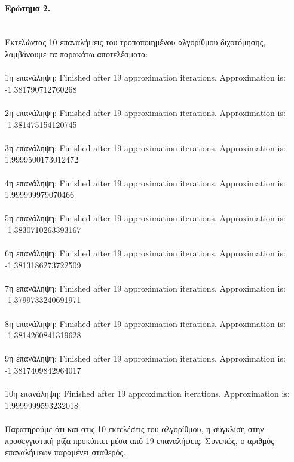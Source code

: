 \documentclass[a4paper,11pt]{article}
\newcommand{\lt}{\latintext}
\begin{document}
\paragraph{Ερώτημα 2.}\mbox{}\\
Εκτελώντας 10 επαναλήψεις του τροποποιημένου αλγορίθμου διχοτόμησης, λαμβάνουμε τα παρακάτω αποτελέσματα:\\
\\1η επανάληψη: {\lt Finished after 19 approximation iterations. Approximation is: -1.381790712760268}\\
\\2η επανάληψη: {\lt Finished after 19 approximation iterations. Approximation is: -1.381475154120745}\\
\\3η επανάληψη: {\lt Finished after 19 approximation iterations. Approximation is: 1.9999500173012472}\\
\\4η επανάληψη: {\lt Finished after 19 approximation iterations. Approximation is: 1.999999979070466}\\
\\5η επανάληψη: {\lt Finished after 19 approximation iterations. Approximation is: -1.3830710263393167}\\
\\6η επανάληψη: {\lt Finished after 19 approximation iterations. Approximation is: -1.3813186273722509}\\
\\7η επανάληψη: {\lt Finished after 19 approximation iterations. Approximation is: -1.3799733240691971}\\
\\8η επανάληψη: {\lt Finished after 19 approximation iterations. Approximation is: -1.3814260841319628}\\
\\9η επανάληψη: {\lt Finished after 19 approximation iterations. Approximation is: -1.3817409842964017}\\
\\10η επανάληψη: {\lt Finished after 19 approximation iterations. Approximation is: 1.9999999593232018}\\
\\Παρατηρούμε ότι και στις 10 εκτελέσεις του αλγορίθμου, η σύγκλιση στην προσεγγιστική ρίζα προκύπτει μέσα από 19 επαναλήψεις. Συνεπώς, ο αριθμός επαναλήψεων παραμένει σταθερός.




			
		
\end{document}
